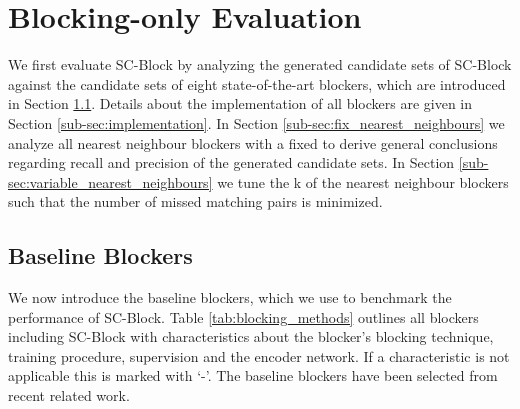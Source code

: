\documentclass[sigconf,nonacm]{acmart}
\begin{document}
 \section{Blocking-only Evaluation}
\label{sec:evaluation_blocking}
 
We first evaluate SC-Block by analyzing the generated candidate sets of SC-Block against the candidate sets of eight state-of-the-art blockers, which are introduced in Section \ref{sub-sec:baseline_blockers}. Details about the implementation of all blockers are given in Section \ref{sub-sec:implementation}.
In Section \ref{sub-sec:fix_nearest_neighbours} we analyze all nearest neighbour blockers with a fixed  to derive general conclusions regarding recall and precision of the generated candidate sets.
In Section \ref{sub-sec:variable_nearest_neighbours} we tune the k of the nearest neighbour blockers such that the number of missed matching pairs is minimized.

\subsection{Baseline Blockers}
\label{sub-sec:baseline_blockers}
We now introduce the baseline blockers, which we use to benchmark the performance of SC-Block.
Table \ref{tab:blocking_methods} outlines all blockers including SC-Block with characteristics about the blocker's blocking technique, training procedure, supervision and the encoder network. If a characteristic is not applicable this is marked with `-'. The baseline blockers have been selected from recent related work.
\end{document}
